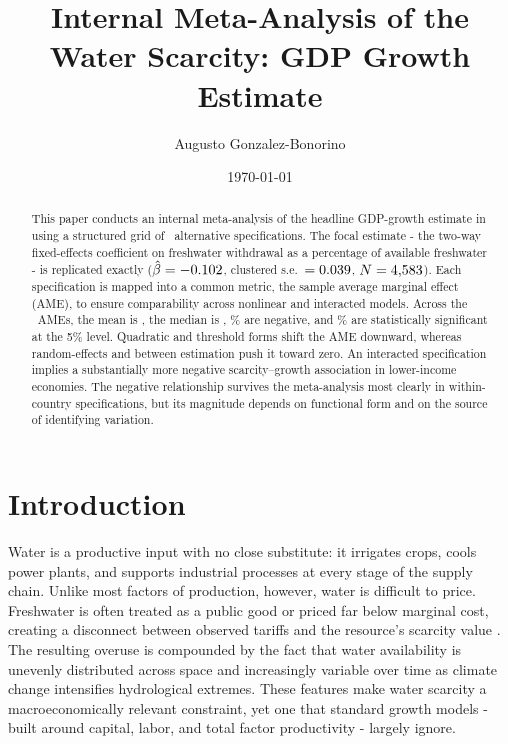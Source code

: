 \documentclass[12pt]{article}
\title{Internal Meta-Analysis of the Water Scarcity: GDP Growth Estimate}
\author{Augusto Gonzalez-Bonorino}
\date{\today}
\begin{document}
\maketitle


\begin{abstract}
This paper conducts an internal meta-analysis of the headline GDP-growth estimate in \citet{frost_madeira_mj_2025} using a structured grid of \TotalSpecs\ alternative specifications. The focal estimate - the two-way fixed-effects coefficient on freshwater withdrawal as a percentage of available freshwater - is replicated exactly ($\hat{\beta} = -0.102$, clustered s.e.\ $= 0.039$, $N = 4{,}583$). Each specification is mapped into a common metric, the sample average marginal effect (AME), to ensure comparability across nonlinear and interacted models. Across the \TotalSpecs\ AMEs, the mean is \MeanAME, the median is \MedianAME, \ShareNegative\% are negative, and \ShareSigFive\% are statistically significant at the 5\% level. Quadratic and threshold forms shift the AME downward, whereas random-effects and between estimation push it toward zero. An interacted specification implies a substantially more negative scarcity--growth association in lower-income economies. The negative relationship survives the meta-analysis most clearly in within-country specifications, but its magnitude depends on functional form and on the source of identifying variation.
\end{abstract}

\section{Introduction}

Water is a productive input with no close substitute: it irrigates crops, cools power plants, and supports industrial processes at every stage of the supply chain. Unlike most factors of production, however, water is difficult to price. Freshwater is often treated as a public good or priced far below marginal cost, creating a disconnect between observed tariffs and the resource's scarcity value \citep{oecd_2010}. The resulting overuse is compounded by the fact that water availability is unevenly distributed across space and increasingly variable over time as climate change intensifies hydrological extremes. These features make water scarcity a macroeconomically relevant constraint, yet one that standard growth models - built around capital, labor, and total factor productivity - largely ignore.
\end{document}
